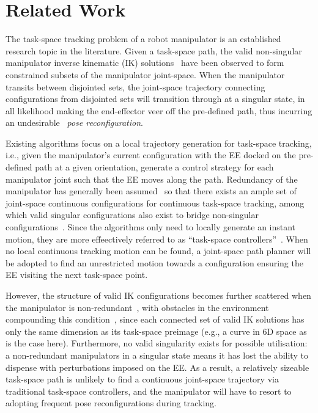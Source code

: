 \documentclass[letterpaper, 10 pt, conference]{ieeeconf}  %
\begin{document}
\section{Related Work}\label{section:related_work}
The task-space tracking problem of a robot manipulator is %
an established research topic in the literature. Given a task-space path, the valid non-singular manipulator inverse kinematic (IK) solutions~\cite{Lavalle2006Planning} have been observed to form constrained subsets of the manipulator joint-space. 
When the manipulator transits between disjointed sets, the joint-space trajectory connecting configurations from disjointed sets will transition through at a singular state, in all likelihood making the end-effector veer off the pre-defined path, thus incurring an undesirable~\textit{ pose reconfiguration}.

Existing algorithms focus on a local trajectory generation for task-space tracking, i.e., given the manipulator's current configuration with the EE docked on the pre-defined path at a given orientation, generate a control strategy for each manipulator joint such that the EE moves along the path. 
Redundancy of the manipulator has generally been assumed~\cite{Egeland1987Task} so that there exists an ample set of joint-space continuous configurations for continuous task-space tracking, among which valid singular configurations also exist to bridge non-singular configurations~\cite{Porta2012Randomized}. 
Since the algorithms only need to locally generate an instant motion, they are  more effeectively referred to as ``task-space controllers''~\cite{Xian2004Task}. 
When no local continuous tracking motion can be found, a joint-space path planner will be adopted to find an unrestricted motion towards a configuration ensuring the EE visiting the next task-space point. 

However, the structure of valid IK configurations becomes further scattered when the manipulator is non-redundant~\cite{Mayorga1987Singularities}, with obstacles in the environment compounding this condition~\cite{Khatib1986Real}, since each connected set of valid IK solutions has only the same dimension as its task-space preimage (e.g., a curve in 6D space as is the case here). Furthermore, no valid singularity exists for possible utilisation: a non-redundant manipulators in a singular state means it has lost the ability to dispense with perturbations imposed on the EE. As a result, a relatively sizeable task-space path is unlikely to find a continuous joint-space trajectory via traditional task-space controllers, and the manipulator will have to resort to adopting frequent pose reconfigurations during tracking. %
\end{document}
